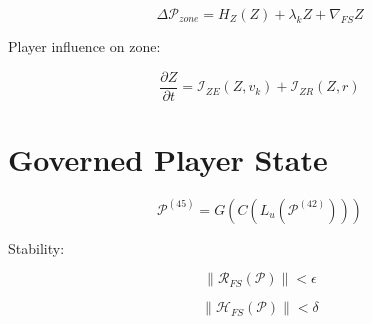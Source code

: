 \[
\Delta \mathcal{P}_{zone}
= H_Z(Z) + \lambda_k Z + \nabla_{FS} Z
\]

Player influence on zone:

\[
\frac{\partial Z}{\partial t}
= \mathcal{I}_{ZE}(Z, v_k) + \mathcal{I}_{ZR}(Z, r)
\]


\section*{Governed Player State}

\[
\mathcal{P}^{(45)} = G(C(L_u(\mathcal{P}^{(42)})))
\]

Stability:

\[
\|\mathcal{R}_{FS}(\mathcal{P})\| < \epsilon
\]

\[
\|\mathcal{H}_{FS}(\mathcal{P})\| < \delta
\]

